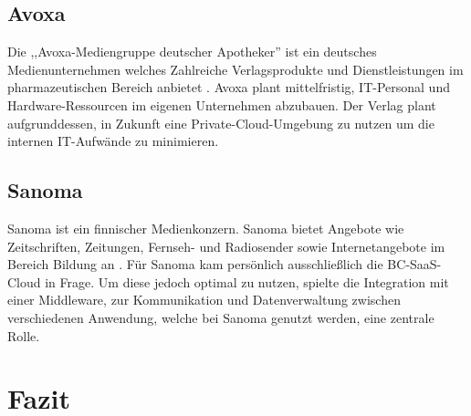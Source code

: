 \documentclass[12pt,bibtotoc]{article}
\begin{document}
			\subsection{Avoxa}\label{Avoxa}
			Die ,,Avoxa-Mediengruppe deutscher Apotheker'' ist ein deutsches Medienunternehmen welches Zahlreiche Verlagsprodukte und Dienstleistungen im pharmazeutischen Bereich anbietet \cite{Avoxa-Website.2024}. \newline 
			Avoxa plant mittelfristig, IT-Personal und Hardware-Ressourcen im eigenen Unternehmen abzubauen. Der Verlag plant aufgrunddessen, in Zukunft eine Private-Cloud-Umgebung zu nutzen um die internen IT-Aufwände zu minimieren.
			\subsection{Sanoma}\label{Sanoma}
			Sanoma ist ein finnischer Medienkonzern. Sanoma bietet Angebote wie Zeitschriften, Zeitungen, Fernseh- und  Radiosender sowie Internetangebote im Bereich Bildung an \cite{Sanoma-Website.2024}. \newline
			Für Sanoma kam persönlich ausschließlich die BC-SaaS-Cloud in Frage. Um diese jedoch optimal zu nutzen, spielte die Integration mit einer Middleware, zur Kommunikation und Datenverwaltung zwischen verschiedenen Anwendung, welche bei Sanoma genutzt werden, eine zentrale Rolle.
		\newpage
	\section{Fazit}
\end{document}
